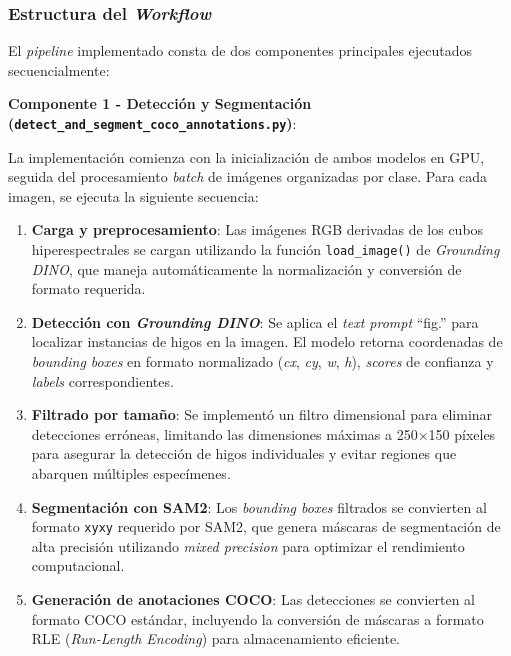 \subsubsection{Estructura del \emph{Workflow}}


El \emph{pipeline} implementado consta de dos componentes principales ejecutados secuencialmente:

\textbf{Componente 1 - Detección y Segmentación (\texttt{detect\_and\_segment\_coco\_annotations.py})}:

La implementación comienza con la inicialización de ambos modelos en GPU, seguida del procesamiento \emph{batch} de imágenes organizadas por clase. Para cada imagen, se ejecuta la siguiente secuencia:

\begin{enumerate}
\item \textbf{Carga y preprocesamiento}: Las imágenes RGB derivadas de los cubos hiperespectrales se cargan utilizando la función \texttt{load\_image()} de \emph{Grounding DINO}, que maneja automáticamente la normalización y conversión de formato requerida.

\item \textbf{Detección con \emph{Grounding DINO}}: Se aplica el \emph{text prompt} ``fig.'' para localizar instancias de higos en la imagen. El modelo retorna coordenadas de \emph{bounding boxes} en formato normalizado (\emph{cx}, \emph{cy}, \emph{w}, \emph{h}), \emph{scores} de confianza y \emph{labels} correspondientes.

\item \textbf{Filtrado por tamaño}: Se implementó un filtro dimensional para eliminar detecciones erróneas, limitando las dimensiones máximas a 250×150 píxeles para asegurar la detección de higos individuales y evitar regiones que abarquen múltiples especímenes.

\item \textbf{Segmentación con SAM2}: Los \emph{bounding boxes} filtrados se convierten al formato \texttt{xyxy} requerido por SAM2, que genera máscaras de segmentación de alta precisión utilizando \emph{mixed precision} para optimizar el rendimiento computacional.

\item \textbf{Generación de anotaciones COCO}: Las detecciones se convierten al formato COCO estándar, incluyendo la conversión de máscaras a formato RLE (\emph{Run-Length Encoding}) para almacenamiento eficiente.
\end{enumerate}

